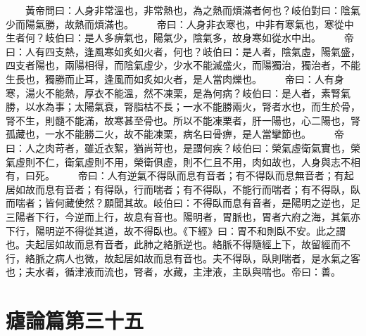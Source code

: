 　　黃帝問曰：人身非常溫也，非常熱也，為之熱而煩滿者何也？岐伯對曰：陰氣少而陽氣勝，故熱而煩滿也。
　　帝曰：人身非衣寒也，中非有寒氣也，寒從中生者何？岐伯曰：是人多痹氣也，陽氣少，陰氣多，故身寒如從水中出。
　　帝曰：人有四支熱，逢風寒如炙如火者，何也？岐伯曰：是人者，陰氣虛，陽氣盛，四支者陽也，兩陽相得，而陰氣虛少，少水不能滅盛火，而陽獨治，獨治者，不能生長也，獨勝而止耳，逢風而如炙如火者，是人當肉爍也。
　　帝曰：人有身寒，湯火不能熱，厚衣不能溫，然不凍栗，是為何病？岐伯曰：是人者，素腎氣勝，以水為事；太陽氣衰，腎脂枯不長；一水不能勝兩火，腎者水也，而生於骨，腎不生，則髓不能滿，故寒甚至骨也。所以不能凍栗者，肝一陽也，心二陽也，腎孤藏也，一水不能勝二火，故不能凍栗，病名曰骨痹，是人當攣節也。
　　帝曰：人之肉苛者，雖近衣絮，猶尚苛也，是謂何疾？岐伯曰：榮氣虛衛氣實也，榮氣虛則不仁，衛氣虛則不用，榮衛俱虛，則不仁且不用，肉如故也，人身與志不相有，曰死。
　　帝曰：人有逆氣不得臥而息有音者；有不得臥而息無音者；有起居如故而息有音者；有得臥，行而喘者；有不得臥，不能行而喘者；有不得臥，臥而喘者；皆何藏使然？願聞其故。岐伯曰：不得臥而息有音者，是陽明之逆也，足三陽者下行，今逆而上行，故息有音也。陽明者，胃脈也，胃者六府之海，其氣亦下行，陽明逆不得從其道，故不得臥也。《下經》曰：胃不和則臥不安。此之謂也。夫起居如故而息有音者，此肺之絡脈逆也。絡脈不得隨經上下，故留經而不行，絡脈之病人也微，故起居如故而息有音也。夫不得臥，臥則喘者，是水氣之客也；夫水者，循津液而流也，腎者，水藏，主津液，主臥與喘也。帝曰：善。


\section{瘧論篇第三十五}

